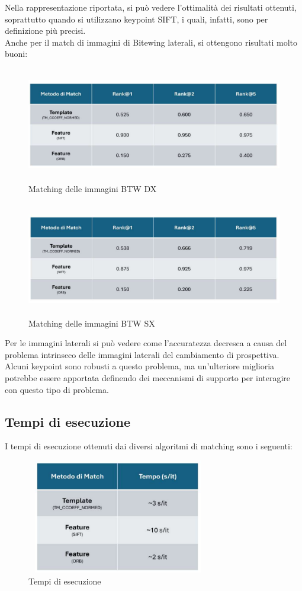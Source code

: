 \documentclass[12pt,a4paper,openright,twoside]{book}
\begin{document}
Nella rappresentazione riportata, si può vedere l'ottimalità dei risultati ottenuti, soprattutto quando si utilizzano keypoint SIFT, i quali, infatti, sono per definizione più precisi. \\
Anche per il match di immagini di Bitewing laterali, si ottengono risultati molto buoni:
\begin{figure}[H]
	\centering
	\includegraphics[height=5cm,width=15cm]{figures/dxprof.pdf}
    	\caption{Matching delle immagini BTW DX}
	\label{fig:dxprof}
\end{figure}
\begin{figure}[H]
	\centering
	\includegraphics[height=5cm,width=15cm]{figures/sxprof.pdf}
    	\caption{Matching delle immagini BTW SX}
	\label{fig:sxprof}
\end{figure}

Per le immagini laterali si può vedere come l'accuratezza decresca a causa del problema intrinseco delle immagini laterali del cambiamento di prospettiva. Alcuni keypoint sono robusti a questo problema, ma un'ulteriore miglioria potrebbe essere apportata definendo dei meccanismi di supporto per interagire con questo tipo di problema. 

\subsection{Tempi di esecuzione}
I tempi di esecuzione ottenuti dai diversi algoritmi di matching sono i seguenti:
\begin{figure}[H]
	\centering
	\includegraphics[height=5cm,width=8cm]{figures/tempiprof.pdf}
    	\caption{Tempi di esecuzione}
	\label{fig:tempiprof}
\end{figure}
\end{document}
